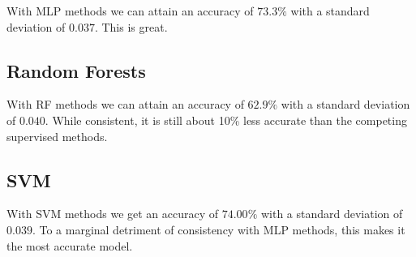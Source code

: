 With MLP methods we can attain an accuracy of $73.3\%$ with a standard deviation of $0.037$. This is great.

\subsection{Random Forests}


With RF methods we can attain an accuracy of $62.9\%$ with a standard deviation of $0.040$. While consistent, it is still about 10\% less accurate than the competing supervised methods.

\subsection{SVM}


With SVM methods we get an accuracy of $74.00\%$ with a standard deviation of $0.039$. To a marginal detriment of consistency with MLP methods, this makes it the most accurate model.